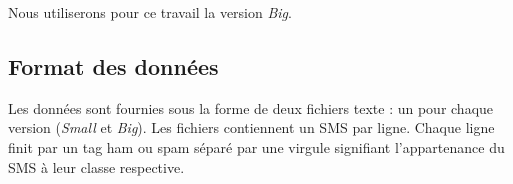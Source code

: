 Nous utiliserons pour ce travail la version \textit{Big}.

\subsection*{Format des données}

Les données sont fournies sous la forme de deux fichiers texte : un pour chaque version (\textit{Small} et \textit{Big}). Les fichiers contiennent un SMS par ligne. Chaque ligne finit par un tag \og ham \fg{} ou \og spam \fg{} séparé par une virgule signifiant l'appartenance du SMS à leur classe respective.